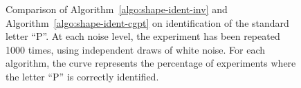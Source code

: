 \begin{figure}[htp]
  \centering
  \caption{Comparison of Algorithm~\ref{algo:shape-ident-inv} and
    Algorithm~\ref{algo:shape-ident-cgpt} on identification of the
    standard letter ``P''. At each noise level, the experiment has
    been repeated 1000 times, using independent draws of white
    noise. For each algorithm, the curve represents the percentage of
    experiments where the letter ``P'' is correctly identified. }
  \label{fig:algorithm_cgpt_vs_inv}
\end{figure}

\def\lettersize{2.7cm}


